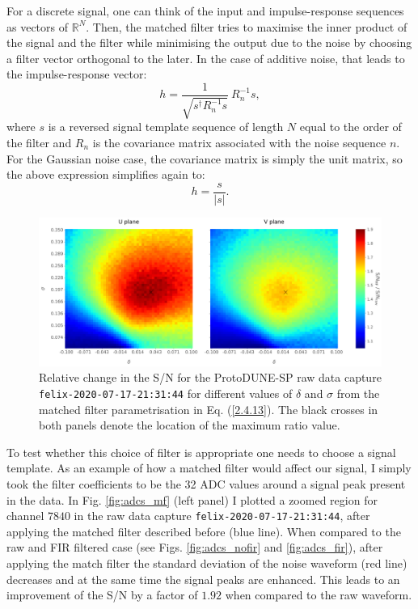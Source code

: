 For a discrete signal, one can think of the input and impulse-response sequences as vectors of $\mathbb{R}^{N}$. Then, the matched filter tries to maximise the inner product of the signal and the filter while minimising the output due to the noise by choosing a filter vector orthogonal to the later. In the case of additive noise, that leads to the impulse-response vector:
\begin{equation}\label{2.4.11}
	h = \frac{1}{\sqrt{s^{\dagger} R_{n}^{-1} s}} \ R_{n}^{-1} s,
\end{equation}
where $s$ is a reversed signal template sequence of length $N$ equal to the order of the filter and $R_{n}$ is the covariance matrix associated with the noise sequence $n$. For the Gaussian noise case, the covariance matrix is simply the unit matrix, so the above expression simplifies again to:
\begin{equation}\label{2.4.12}
	h = \frac{s}{|s|}.
\end{equation}

\begin{figure}[t]
	\centering
	\includegraphics[width=1\linewidth]{Images/Matched_Filter/mf_fir_opt.png}
	\caption[Relative change in the S/N for the ProtoDUNE-SP raw data capture for different values of $\delta$ and $\sigma$ from the matched filter parametrisation.]{Relative change in the S/N for the ProtoDUNE-SP raw data capture \texttt{felix-2020-07-17-21:31:44} for different values of $\delta$ and $\sigma$ from the matched filter parametrisation in Eq. (\ref{2.4.13}). The black crosses in both panels denote the location of the maximum ratio value.}
	\label{fig:mf_opt}
\end{figure}

To test whether this choice of filter is appropriate one needs to choose a signal template. As an example of how a matched filter would affect our signal, I simply took the filter coefficients to be the 32 ADC values around a signal peak present in the data. In Fig. \ref{fig:adcs_mf} (left panel) I plotted a zoomed region for channel $7840$ in the raw data capture \texttt{felix-2020-07-17-21:31:44}, after applying the matched filter described before (blue line). When compared to the raw and FIR filtered case (see Figs. \ref{fig:adcs_nofir} and \ref{fig:adcs_fir}), after applying the match filter the standard deviation of the noise waveform (red line) decreases and at the same time the signal peaks are enhanced. This leads to an improvement of the S/N by a factor of $1.92$ when compared to the raw waveform.

